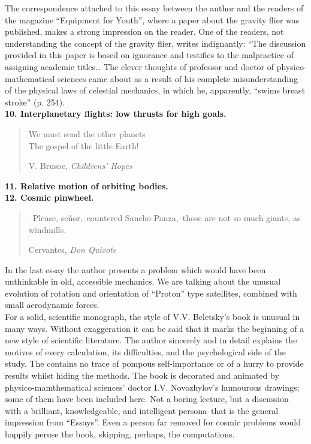 \documentclass[12pt]{amsart}
\begin{document}
The correspondence attached to this essay between the author and the readers of
the magazine ``Equipment for Youth'', where a paper about the gravity flier was
published, makes a strong impression on the reader.
One of the readers, not understanding the concept of the gravity flier, writes
indignantly: ``The discussion provided in this paper is based on ignorance and
testifies to the malpractice of assigning academic titles\dots
The clever thoughts of professor and doctor of physico-mathematical sciences
came about as a result of his complete misunderstanding of the physical laws of
celestial mechanics, in which he, apparently, ``swims breast stroke'' (p. 254).\\

\noindent\textbf{10. Interplanetary flights: low thrusts for high goals.}

\begin{quote}
We must send the other planets\\
The gospel of the little Earth!

V. Brusoe, \textit{Childrens' Hopes}
\end{quote}

\noindent\textbf{11. Relative motion of orbiting bodies.}\\

\noindent\textbf{12. Cosmic pinwheel.}

\begin{quote}
\indent--Please, señor,--countered Sancho Panza,--those are not so much giants,
as windmills.

Cervantes, \textit{Don Quixote}
\end{quote}

In the last essay the author presents a problem which would have been
unthinkable in old, accessible mechanics.
We are talking about the unusual evolution of rotation and orientation of
``Proton'' type satellites, combined with small aerodynamic forces.\\

For a solid, scientific monograph, the style of V.V. Beletsky's book is unusual
in many ways.
Without exaggeration it can be said that it marks the beginning of a new style
of scientific literature.
The author sincerely and in detail explains the motives of every calculation,
its difficulties, and the psychological side of the study.
The contains no trace of pompous self-importance or of a hurry to provide
results whilst hiding the methods.
The book is decorated and animated by physico-mamthematical sciences' doctor
I.V. Novozhylov's humourous drawings; some of them have been included here.
Not a boring lecture, but a discussion with a brilliant, knowledgeable, and
intelligent persona--that is the general impression from ``Essays''.
Even a person far removed for cosmic problems would happily peruse the book,
skipping, perhaps, the computations.
\end{document}
